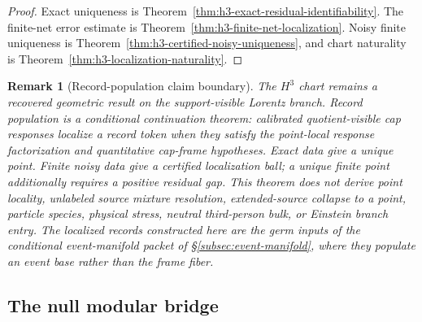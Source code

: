\documentclass[11pt]{article}
\newtheorem{remark}[theorem]{Remark}
\begin{document}
\begin{proof}
Exact uniqueness is Theorem~\ref{thm:h3-exact-residual-identifiability}. The
finite-net error estimate is Theorem~\ref{thm:h3-finite-net-localization}.
Noisy finite uniqueness is Theorem~\ref{thm:h3-certified-noisy-uniqueness}, and
chart naturality is Theorem~\ref{thm:h3-localization-naturality}.
\end{proof}

\begin{remark}[Record-population claim boundary]\label{rem:h3-localization-claim-boundary}
The \(H^3\) chart remains a recovered geometric result on the support-visible
Lorentz branch. Record population is a conditional continuation theorem:
calibrated quotient-visible cap responses localize a record token when they
satisfy the point-local response factorization and quantitative cap-frame
hypotheses. Exact data give a unique point. Finite noisy data give a certified
localization ball; a unique finite point additionally requires a positive
residual gap. This theorem does not derive point locality, unlabeled source
mixture resolution, extended-source collapse to a point, particle species,
physical stress, neutral third-person bulk, or Einstein branch entry. The localized
records constructed here are the germ inputs of the conditional event-manifold packet of
\S\ref{subsec:event-manifold}, where they populate an event base rather than the frame
fiber.
\end{remark}
\subsection{The null modular bridge}
\end{document}
